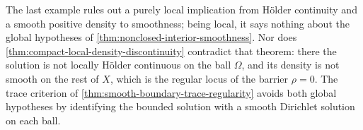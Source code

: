 The last example rules out a purely local implication from H\"older continuity and a smooth positive density to smoothness; being local, it says nothing about the global hypotheses of \cref{thm:nonclosed-interior-smoothness}. Nor does \cref{thm:compact-local-density-discontinuity} contradict that theorem: there the solution is not locally H\"older continuous on the ball $\Omega$, and its density is not smooth on the rest of $X$, which is the regular locus of the barrier $\rho=0$. The trace criterion of \cref{thm:smooth-boundary-trace-regularity} avoids both global hypotheses by identifying the bounded solution with a smooth Dirichlet solution on each ball.
